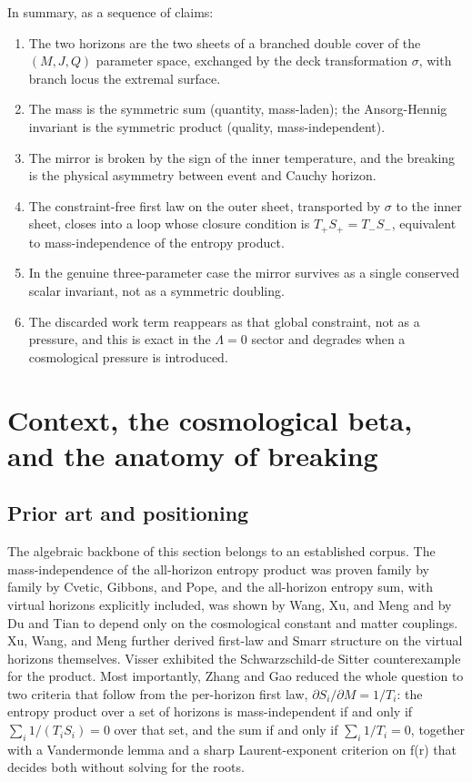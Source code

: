 \documentclass[11pt]{article}
\begin{document}
In summary, as a sequence of claims:

\begin{enumerate}
\item The two horizons are the two sheets of a branched double cover of the $(M,J,Q)$ parameter space, exchanged by the deck transformation $\sigma$, with branch locus the extremal surface.
\item The mass is the symmetric sum (quantity, mass-laden); the Ansorg-Hennig invariant is the symmetric product (quality, mass-independent).
\item The mirror is broken by the sign of the inner temperature, and the breaking is the physical asymmetry between event and Cauchy horizon.
\item The constraint-free first law on the outer sheet, transported by $\sigma$ to the inner sheet, closes into a loop whose closure condition is $T_+S_+ = T_-S_-$, equivalent to mass-independence of the entropy product.
\item In the genuine three-parameter case the mirror survives as a single conserved scalar invariant, not as a symmetric doubling.
\item The discarded work term reappears as that global constraint, not as a pressure, and this is exact in the $\Lambda = 0$ sector and degrades when a cosmological pressure is introduced.
\end{enumerate}



\section{Context, the cosmological beta, and the anatomy of breaking}

\subsection{Prior art and positioning}

The algebraic backbone of this section belongs to an established corpus. The mass-independence of the all-horizon entropy product was proven family by family by Cvetic, Gibbons, and Pope, and the all-horizon entropy sum, with virtual horizons explicitly included, was shown by Wang, Xu, and Meng and by Du and Tian to depend only on the cosmological constant and matter couplings. Xu, Wang, and Meng further derived first-law and Smarr structure on the virtual horizons themselves. Visser exhibited the Schwarzschild-de Sitter counterexample for the product. Most importantly, Zhang and Gao reduced the whole question to two criteria that follow from the per-horizon first law, $\partial S_i/\partial M = 1/T_i$: the entropy product over a set of horizons is mass-independent if and only if $\sum_i 1/(T_i S_i) = 0$ over that set, and the sum if and only if $\sum_i 1/T_i = 0$, together with a Vandermonde lemma and a sharp Laurent-exponent criterion on f(r) that decides both without solving for the roots.
\end{document}
